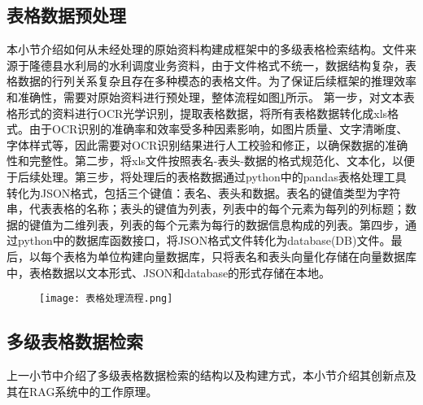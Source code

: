 \subsection{表格数据预处理}
本小节介绍如何从未经处理的原始资料构建成框架中的多级表格检索结构。文件来源于隆德县水利局的水利调度业务资料，由于文件格式不统一，数据结构复杂，表格数据的行列关系复杂且存在多种模态的表格文件。为了保证后续框架的推理效率和准确性，需要对原始资料进行预处理，整体流程如图\ref{fig:4-3}所示。
第一步，对文本表格形式的资料进行OCR光学识别，提取表格数据，将所有表格数据转化成xls格式。由于OCR识别的准确率和效率受多种因素影响，如图片质量、文字清晰度、字体样式等，因此需要对OCR识别结果进行人工校验和修正，以确保数据的准确性和完整性。第二步，将xls文件按照表名-表头-数据的格式规范化、文本化，以便于后续处理。第三步，将处理后的表格数据通过python中的pandas表格处理工具转化为JSON格式，包括三个键值：表名、表头和数据。表名的键值类型为字符串，代表表格的名称；表头的键值为列表，列表中的每个元素为每列的列标题；数据的键值为二维列表，列表的每个元素为每行的数据信息构成的列表。第四步，通过python中的数据库函数接口，将JSON格式文件转化为database(DB)文件。最后，以每个表格为单位构建向量数据库，只将表名和表头向量化存储在向量数据库中，表格数据以文本形式、JSON和database的形式存储在本地。

\begin{figure}[h]
    \centering
    \texttt{[image: 表格处理流程.png]}
    \label{fig:4-3}
\end{figure}
\subsection{多级表格数据检索}

上一小节中介绍了多级表格数据检索的结构以及构建方式，本小节介绍其创新点及其在RAG系统中的工作原理。

